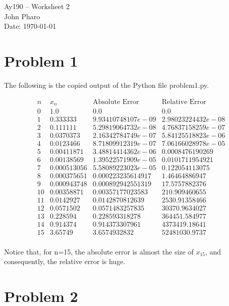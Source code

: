 \documentclass[11pt,letterpaper]{article}
\begin{document}
\begin{center}
\Large
Ay190 -- Worksheet 2\\
John Pharo\\
Date: \today
\end{center}

\section*{Problem 1}

The following is the copied output of the Python file problem1.py.

\[
\begin{array}{lllllllllllllllll}
n & x_n & \text{Absolute Error} & \text{Relative Error} \\
0 & 1.0 & 0.0 & 0.0 \\ 
1 & 0.333333 & 9.93410748107e-09 & 2.98023224432e-08 \\ 
2 & 0.111111 & 5.29819064732e-08 & 4.76837158259e-07 \\ 
3 & 0.0370373 & 2.16342784749e-07 & 5.84125518823e-06 \\ 
4 & 0.0123466 & 8.71809912319e-07 & 7.06166028978e-05 \\ 
5 & 0.00411871 & 3.48814414362e-06 & 0.0008476190269 \\ 
6 & 0.00138569 & 1.39522571909e-05 & 0.0101711954921 \\ 
7 & 0.000513056 & 5.58089223023e-05 & 0.122054113075 \\ 
8 & 0.000375651 & 0.000223235614917 & 1.46464886947 \\ 
9 & 0.000943748 & 0.000892942551319 & 17.5757882376 \\ 
10 & 0.00358871 & 0.00357177023583 & 210.909460655 \\ 
11 & 0.0142927 & 0.0142870812639 & 2530.91358466 \\ 
12 & 0.0571502 & 0.0571483257835 & 30370.9634027 \\ 
13 & 0.228594 & 0.228593318278 & 364451.584977 \\ 
14 & 0.914374 & 0.914373307961 & 4373419.18641 \\ 
15 & 3.65749 & 3.6574932832 & 52481030.9737 \\ 
\end{array}
\]

Notice that, for n=15, the absolute error is almost the size of $x_{15}$, and consequently, the relative error is huge.

\section*{Problem 2}
\end{document}
